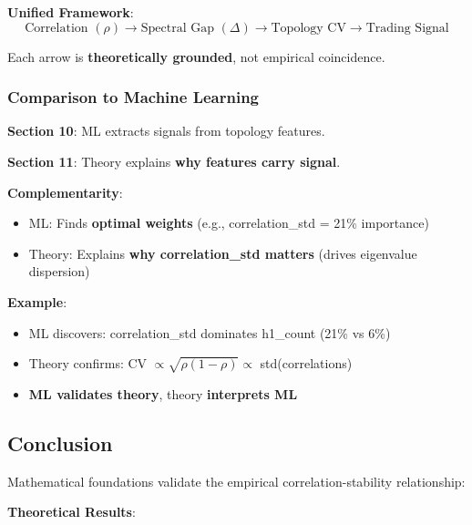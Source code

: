 \textbf{Unified Framework}:
\begin{equation*}
\text{Correlation } (\rho) \rightarrow \text{Spectral Gap } (\Delta) \rightarrow \text{Topology CV} \rightarrow \text{Trading Signal}
\end{equation*}

Each arrow is \textbf{theoretically grounded}, not empirical coincidence.

\subsubsection{Comparison to Machine Learning}

\textbf{Section 10}: ML extracts signals from topology features.

\textbf{Section 11}: Theory explains \textbf{why features carry signal}.

\textbf{Complementarity}:
\begin{itemize}
\item ML: Finds \textbf{optimal weights} (e.g., correlation\_std = 21\% importance)
\item Theory: Explains \textbf{why correlation\_std matters} (drives eigenvalue dispersion)
\end{itemize}

\textbf{Example}:
\begin{itemize}
\item ML discovers: correlation\_std dominates h1\_count (21\% vs 6\%)
\item Theory confirms: CV $\propto \sqrt{\rho(1-\rho)} \propto$ std(correlations)
\item \textbf{ML validates theory}, theory \textbf{interprets ML}
\end{itemize}

\subsection{Conclusion}

Mathematical foundations validate the empirical correlation-stability relationship:

\textbf{Theoretical Results}:

